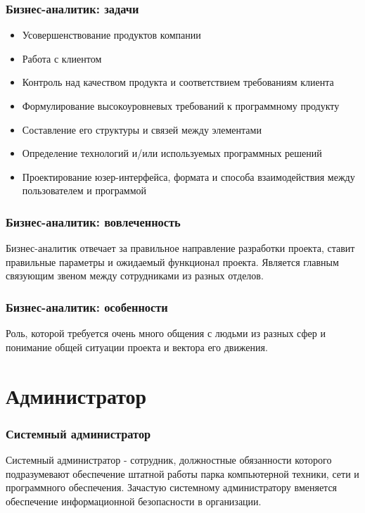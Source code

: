 \documentclass{../industrial-development}
\begin{document}
	\begin{frame} \frametitle{Бизнес-аналитик: задачи}
		\begin{itemize}
			\item Усовершенствование продуктов компании
			\item Работа с клиентом
			\item Контроль над качеством продукта и соответствием требованиям клиента
			\item Формулирование высокоуровневых требований к программному продукту
			\item Составление его структуры и связей между элементами
			\item Определение технологий и/или используемых программных решений
			\item Проектирование юзер-интерфейса, формата и способа взаимодействия между пользователем и программой
		\end{itemize}
	\end{frame}

	\begin{frame} \frametitle{Бизнес-аналитик: вовлеченность}
		Бизнес-аналитик отвечает за правильное направление разработки проекта, ставит правильные параметры и ожидаемый функционал проекта. Является главным связующим звеном между сотрудниками из разных отделов.
	\end{frame}
	
	\begin{frame} \frametitle{Бизнес-аналитик: особенности}
		Роль, которой требуется очень много общения с людьми из разных сфер и понимание общей ситуации проекта и вектора его движения. 
	\end{frame}
	
	
	\section{Администратор} 
	
	\begin{frame} \frametitle{Системный администратор}
		\begin{block}{}
			\alert {Системный администратор} - сотрудник, должностные обязанности которого подразумевают обеспечение штатной работы парка компьютерной техники, сети и программного обеспечения. Зачастую системному администратору вменяется обеспечение информационной безопасности в организации.
		\end{block}
	\end{frame}
	
\end{document}
